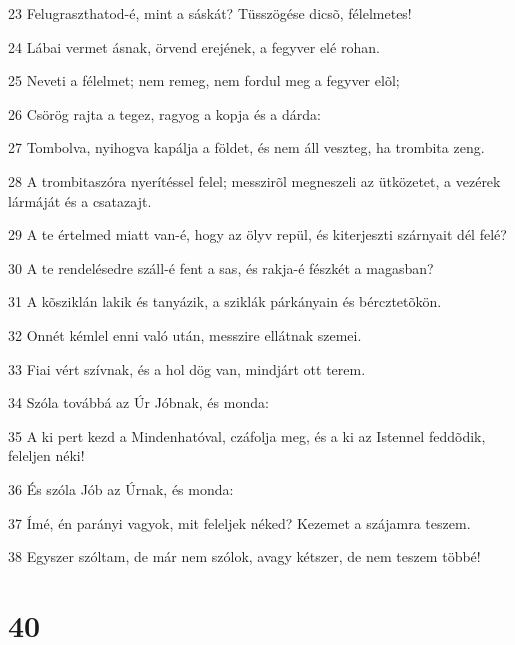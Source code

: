 \par 23 Felugraszthatod-é, mint a sáskát? Tüsszögése dicsõ, félelmetes!
\par 24 Lábai vermet ásnak, örvend erejének, a fegyver elé rohan.
\par 25 Neveti a félelmet; nem remeg, nem fordul meg a fegyver elõl;
\par 26 Csörög rajta a tegez, ragyog a kopja és a dárda:
\par 27 Tombolva, nyihogva kapálja a földet, és nem áll veszteg, ha trombita zeng.
\par 28 A trombitaszóra nyerítéssel felel; messzirõl megneszeli az ütközetet, a vezérek lármáját és a csatazajt.
\par 29 A te értelmed miatt van-é, hogy az ölyv repül, és kiterjeszti szárnyait dél felé?
\par 30 A te rendelésedre száll-é fent a sas, és rakja-é fészkét a magasban?
\par 31 A kõsziklán lakik és tanyázik, a sziklák párkányain és bércztetõkön.
\par 32 Onnét kémlel enni való után, messzire ellátnak szemei.
\par 33 Fiai vért szívnak, és a hol dög van, mindjárt ott terem.
\par 34 Szóla továbbá az Úr Jóbnak, és monda:
\par 35 A ki pert kezd a Mindenhatóval, czáfolja meg, és a ki az Istennel feddõdik, feleljen néki!
\par 36 És szóla Jób az Úrnak, és monda:
\par 37 Ímé, én parányi vagyok, mit feleljek néked? Kezemet a szájamra teszem.
\par 38 Egyszer szóltam, de már nem szólok, avagy kétszer, de nem teszem többé!

\chapter{40}

